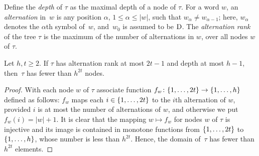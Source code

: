 Define the
\emph{depth} of $\tau$ as 
the maximal depth of a node of $\tau$.
For a word $w$, an \emph{alternation} in~$w$ is any 
position $\alpha$, $1\leq \alpha\leq |w|$, such that $w_\alpha\neq w_{\alpha-1}$; here, $w_\alpha$ denotes the $\alpha$th symbol of~$w$, and~$w_0$ is assumed to be $\mathrm{D}$.
The \emph{alternation rank} of the tree $\tau$ is the maximum of the number of alternations in $w$, over all nodes $w$ of $\tau$.


\begin{lemma}\label{lem:number-of-nodes}
Let $h,t\ge 2$.	If $\tau$ has alternation rank at most $2t-1$ and depth at most $h-1$, then~$\tau$ has fewer than $h^{2t}$ nodes.
\end{lemma}
\begin{proof}		
	With each node $w$ of $\tau$ associate
	function $f_w\colon \{1,\ldots,2t\}\to\{1,\ldots,h\}$ defined as follows:
	$f_w$ maps each $i\in \{1,\ldots,2t\}$ to the $i$th alternation of $w$, provided $i$ is at most the number of alternations of $w$, and otherwise we put $f_w(i)=|w|+1$.
	It is clear that the mapping $w\mapsto f_w$ for nodes $w$ of $\tau$ is injective
and its image is contained in monotone functions from $\{1,\ldots,2t\}$ to $\{1,\ldots,h\}$, whose number is less than $h^{2t}$.
Hence, the domain of~$\tau$ 
		has fewer than $h^{2t}$ elements.
\end{proof}

